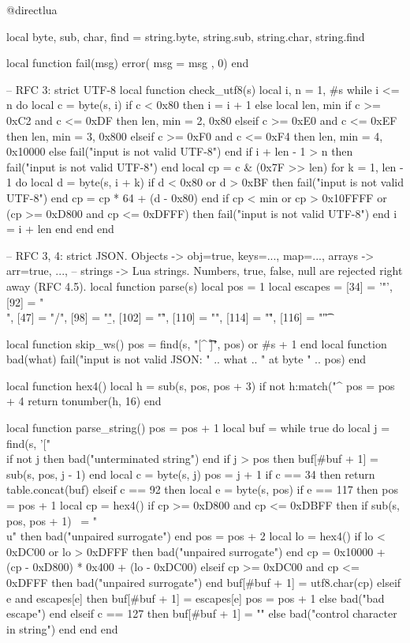 @directlua{
local byte, sub, char, find = string.byte, string.sub, string.char, string.find

local function fail(msg) error({ msg = msg }, 0) end

-- RFC 3: strict UTF-8
local function check_utf8(s)
  local i, n = 1, #s
  while i <= n do
    local c = byte(s, i)
    if c < 0x80 then
      i = i + 1
    else
      local len, min
      if c >= 0xC2 and c <= 0xDF then len, min = 2, 0x80
      elseif c >= 0xE0 and c <= 0xEF then len, min = 3, 0x800
      elseif c >= 0xF0 and c <= 0xF4 then len, min = 4, 0x10000
      else fail("input is not valid UTF-8") end
      if i + len - 1 > n then fail("input is not valid UTF-8") end
      local cp = c & (0x7F >> len)
      for k = 1, len - 1 do
        local d = byte(s, i + k)
        if d < 0x80 or d > 0xBF then fail("input is not valid UTF-8") end
        cp = cp * 64 + (d - 0x80)
      end
      if cp < min or cp > 0x10FFFF or (cp >= 0xD800 and cp <= 0xDFFF) then
        fail("input is not valid UTF-8")
      end
      i = i + len
    end
  end
end

-- RFC 3, 4: strict JSON. Objects -> {obj=true, keys=..., map=...}, arrays -> {arr=true, ...},
-- strings -> Lua strings. Numbers, true, false, null are rejected right away (RFC 4.5).
local function parse(s)
  local pos = 1
  local escapes = { [34] = '"', [92] = "\\", [47] = "/", [98] = "\b", [102] = "\f",
    [110] = "\n", [114] = "\r", [116] = "\t" }

  local function skip_ws() pos = find(s, "[^ \t\r\n]", pos) or #s + 1 end
  local function bad(what) fail("input is not valid JSON: " .. what .. " at byte " .. pos) end

  local function hex4()
    local h = sub(s, pos, pos + 3)
    if not h:match("^%
    pos = pos + 4
    return tonumber(h, 16)
  end

  local function parse_string()
    pos = pos + 1
    local buf = {}
    while true do
      local j = find(s, '["\\%
      if not j then bad("unterminated string") end
      if j > pos then buf[#buf + 1] = sub(s, pos, j - 1) end
      local c = byte(s, j)
      pos = j + 1
      if c == 34 then
        return table.concat(buf)
      elseif c == 92 then
        local e = byte(s, pos)
        if e == 117 then
          pos = pos + 1
          local cp = hex4()
          if cp >= 0xD800 and cp <= 0xDBFF then
            if sub(s, pos, pos + 1) ~= "\\u" then bad("unpaired surrogate") end
            pos = pos + 2
            local lo = hex4()
            if lo < 0xDC00 or lo > 0xDFFF then bad("unpaired surrogate") end
            cp = 0x10000 + (cp - 0xD800) * 0x400 + (lo - 0xDC00)
          elseif cp >= 0xDC00 and cp <= 0xDFFF then
            bad("unpaired surrogate")
          end
          buf[#buf + 1] = utf8.char(cp)
        elseif e and escapes[e] then
          buf[#buf + 1] = escapes[e]
          pos = pos + 1
        else
          bad("bad escape")
        end
      elseif c == 127 then
        buf[#buf + 1] = ""
      else
        bad("control character in string")
      end
    end
  end

}
